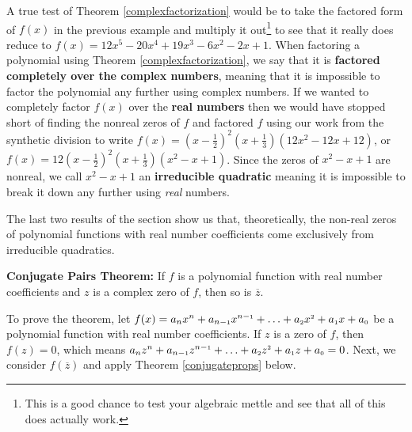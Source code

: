 A true test of Theorem \ref{complexfactorization} would be to take the factored form of $f(x)$ in the previous example and multiply it out\footnote{This is a good chance to test your algebraic mettle and see that all of this does actually work.} to see that it really does reduce to  $f(x) = 12x^5 - 20x^4+19x^3-6x^2-2x+1$.  When factoring a polynomial using Theorem \ref{complexfactorization}, we say that it is  \textbf{factored completely over the complex numbers}, meaning that it is impossible to factor the polynomial any further using complex numbers.  If we wanted to   completely factor $f(x)$ over the \textbf{real numbers} then we would have stopped short of finding the nonreal zeros of $f$ and factored $f$ using our work from the synthetic division to write $f(x) = \left(x - \frac{1}{2} \right)^2 \left(x + \frac{1}{3} \right)\left(12x^2 - 12x + 12\right)$, or $f(x) = 12\left(x - \frac{1}{2} \right)^2 \left(x + \frac{1}{3} \right)\left(x^2 - x + 1\right)$.  Since the zeros of $x^2-x+1$ are nonreal, we call $x^2-x+1$ an \textbf{irreducible quadratic} meaning it is impossible to break it down any further using \emph{real} numbers.  

The last two results of the section show us that, theoretically, the non-real zeros of polynomial functions with real number coefficients come exclusively from irreducible quadratics.

\begin{tcolorbox}

\begin{thm} \label{conjugatepairsthm}\textbf{Conjugate Pairs Theorem:} If $f$ is a polynomial function with real number coefficients and $z$ is a complex zero of $f$, then so is $\overline{z}$. 

\end{thm}

\end{tcolorbox}

To prove the theorem, let 
$ f(x) = a_{n} x^{n} + a_{n-\mbox{\tiny$1$}} x^{n-\mbox{\tiny$1$}} + \ldots + a_{\mbox{\tiny $2$}} x^{\mbox{\tiny $2$}} + a_{\mbox{\tiny $1$}} x + a_{\mbox{\tiny $0$}}$ be a polynomial function with real number coefficients.  If $z$ is a zero of $f$, then $f(z) = 0$, which means $a_{n} z^{n} + a_{n-\mbox{\tiny$1$}} z^{n-\mbox{\tiny$1$}} + \ldots + a_{\mbox{\tiny $2$}} z^{\mbox{\tiny $2$}} + a_{\mbox{\tiny $1$}} z + a_{\mbox{\tiny $0$}} = 0$.  Next, we consider $f\left(\overline{z}\right)$ and apply Theorem \ref{conjugateprops} below.

